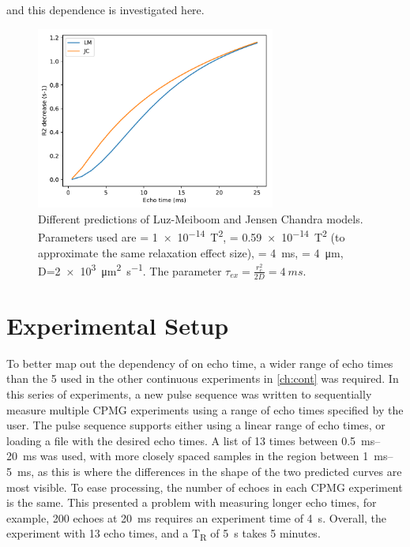 and this dependence is investigated here.

\begin{figure}[tb]
\centering
\includegraphics[width=0.7\textwidth]{figures/diffmodels/JCLMtheorycomparison.pdf}
\caption[Different predictions of Luz-Meiboom and Jensen Chandra models]{Different predictions of Luz-Meiboom and Jensen Chandra models. Parameters used are \Gzero = \SI{1e-14}{T^2}, \Kzero = \SI{0.59e-14}{T^2} (to approximate the same relaxation effect size), \Texc = \SI{4}{ms}, \rc = \SI{4}{\micro\metre}, D=\SI{2e3}{\micro\metre\squared\per\second}. The parameter $\tau_{ex} = \frac{r_c^2}{2D} = \SI{4}{ms}$.}
\label{fig:dm-JCLMtheory}
\end{figure}

\section{Experimental Setup}
To better map out the dependency of \Ttwo on echo time, a wider range of echo times than the 5 used in the other continuous experiments in \autoref{ch:cont} was required.
In this series of experiments, a new pulse sequence  was written to sequentially measure multiple CPMG experiments using a range of echo times specified by the user.
The pulse sequence supports either using a linear range of echo times, or loading a file with the desired echo times.
A list of 13 times between \SIrange{0.5}{20}{ms} was used, with more closely spaced samples in the region between \SIrange{1}{5}{ms}, as this is where the differences in the shape of the two predicted curves are most visible.
To ease processing, the number of echoes in each CPMG experiment is the same.
This presented a problem with measuring longer echo times, for example, 200 echoes at \SI{20}{ms} requires an experiment time of \SI{4}{\second}.
Overall, the experiment with 13 echo times, and a T\textsubscript{R} of \SI{5}{\second} takes 5 minutes.


